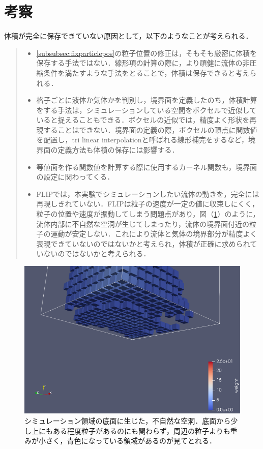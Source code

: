 \documentclass[a4j,12pt]{jreport}
\begin{document}
\section{考察} \label{sec:exp_consideration}
体積が完全に保存できていない原因として，以下のようなことが考えられる．
\begin{quote}
	\begin{itemize}
		\item \ref{subsubsec:fixparticlepos}の粒子位置の修正は，そもそも厳密に体積を保存する手法ではない．線形項の計算の際に，より頑健に流体の非圧縮条件を満たすような手法をとることで，体積は保存できると考えられる．
		\item 格子ごとに液体か気体かを判別し，境界面を定義したのち，体積計算をする手法は，シミュレーションしている空間をボクセルで近似していると捉えることもできる．ボクセルの近似では，精度よく形状を再現することはできない．境界面の定義の際，ボクセルの頂点に関数値を配置し，tri linear interpolationと呼ばれる線形補完をするなど，境界面の定義方法も体積の保存には影響する．
		\item 等値面を作る関数値を計算する際に使用するカーネル関数も，境界面の設定に関わってくる．
		\item FLIPでは，本実験でシミュレーションしたい流体の動きを，完全には再現しきれていない．FLIPは粒子の速度が一定の値に収束しにくく，粒子の位置や速度が振動してしまう問題点があり，図（\ref{fig:space}）のように，流体内部に不自然な空洞が生じてしまったり，流体の境界面付近の粒子の運動が安定しない．これにより流体と気体の境界部分が精度よく表現できていないのではないかと考えられ，体積が正確に求められていないのではないかと考えられる．
	\end{itemize}
\end{quote}

\begin{figure}[htbp]
\begin{center}
\includegraphics[width=160mm]{artificial_space.png}
\end{center}
\caption{シミュレーション領域の底面に生じた，不自然な空洞．底面から少し上にもある程度粒子があるのにも関わらず，周辺の粒子よりも重みが小さく，青色になっている領域があるのが見てとれる．}
\label{fig:space}
\end{figure}
\end{document}
